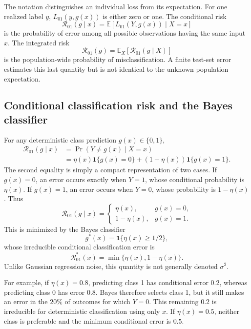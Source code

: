 \documentclass[11pt,a4paper]{article}
\newcommand{\R}{\mathcal R}
\newcommand{\ind}{\mathbf{1}}
\begin{document}
The notation distinguishes an individual loss from its expectation. For one realized label $y$, $L_{01}(y,g(x))$ is either zero or one. The conditional risk
\begin{equation}
  \R_{01}(g\mid x)
  =\mathbb E[L_{01}(Y,g(x))\mid X=x]
\end{equation}
is the probability of error among all possible observations having the same input $x$. The integrated risk
\begin{equation}
  \R_{01}(g)=\mathbb E_X[\R_{01}(g\mid X)]
\end{equation}
is the population-wide probability of misclassification. A finite test-set error estimates this last quantity but is not identical to the unknown population expectation.

\subsection{Conditional classification risk and the Bayes classifier}

For any deterministic class prediction $g(x)\in\{0,1\}$,
\begin{align}
  \R_{01}(g\mid x)
  &=\Pr(Y\neq g(x)\mid X=x)\\
  &=\eta(x)\ind\{g(x)=0\}
    +(1-\eta(x))\ind\{g(x)=1\}.
\end{align}
The second equality is simply a compact representation of two cases. If $g(x)=0$, an error occurs exactly when $Y=1$, whose conditional probability is $\eta(x)$. If $g(x)=1$, an error occurs when $Y=0$, whose probability is $1-\eta(x)$. Thus
\begin{equation*}
  \R_{01}(g\mid x)
  =\begin{cases}
    \eta(x), & g(x)=0,\\
    1-\eta(x), & g(x)=1.
  \end{cases}
\end{equation*}
This is minimized by the Bayes classifier
\begin{equation}
  g^{*}(x)=\ind\{\eta(x)\geq 1/2\},
\end{equation}
whose irreducible conditional classification error is
\begin{equation}
  \R_{01}^{*}(x)=\min\{\eta(x),1-\eta(x)\}.
\end{equation}
Unlike Gaussian regression noise, this quantity is not generally denoted $\sigma^2$.

For example, if $\eta(x)=0.8$, predicting class 1 has conditional error $0.2$, whereas predicting class 0 has error $0.8$. Bayes therefore selects class 1, but it still makes an error in the $20\%$ of outcomes for which $Y=0$. This remaining $0.2$ is irreducible for deterministic classification using only $x$. If $\eta(x)=0.5$, neither class is preferable and the minimum conditional error is $0.5$.
\end{document}
